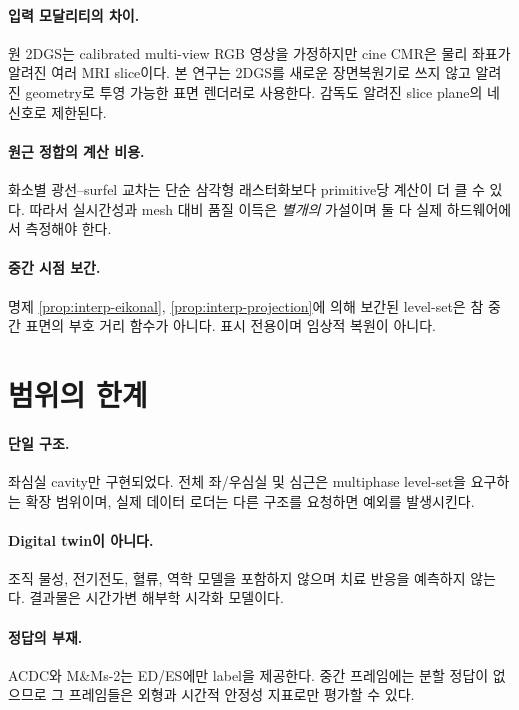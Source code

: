 \paragraph{입력 모달리티의 차이.}
원 2DGS는 calibrated multi-view RGB 영상을 가정하지만 cine CMR은 물리 좌표가 알려진
여러 MRI slice이다. 본 연구는 2DGS를 새로운 장면복원기로 쓰지 않고 알려진 geometry로
투영 가능한 표면 렌더러로 사용한다. 감독도 알려진 slice plane의 네 신호로 제한된다.

\paragraph{원근 정합의 계산 비용.}
화소별 광선--surfel 교차는 단순 삼각형 래스터화보다 primitive당 계산이 더 클 수 있다.
따라서 실시간성과 mesh 대비 품질 이득은 \emph{별개의} 가설이며 둘 다 실제 하드웨어에서
측정해야 한다.

\paragraph{중간 시점 보간.}
명제 \ref{prop:interp-eikonal}, \ref{prop:interp-projection}에 의해 보간된 level-set은
참 중간 표면의 부호 거리 함수가 아니다. 표시 전용이며 임상적 복원이 아니다.

\section{범위의 한계}

\paragraph{단일 구조.}
좌심실 cavity만 구현되었다. 전체 좌/우심실 및 심근은 multiphase level-set을 요구하는
확장 범위이며, 실제 데이터 로더는 다른 구조를 요청하면 예외를 발생시킨다.

\paragraph{Digital twin이 아니다.}
조직 물성, 전기전도, 혈류, 역학 모델을 포함하지 않으며 치료 반응을 예측하지 않는다.
결과물은 시간가변 해부학 시각화 모델이다.

\paragraph{정답의 부재.}
ACDC와 M\&Ms-2는 ED/ES에만 label을 제공한다. 중간 프레임에는 분할 정답이 없으므로
그 프레임들은 외형과 시간적 안정성 지표로만 평가할 수 있다.

